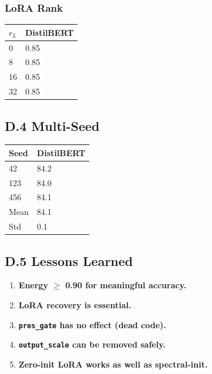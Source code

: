 \subsubsection{LoRA Rank}

\begin{table}[H]
\centering
\small
\begin{tabular}{ll}
\toprule
\textbf{$r_L$} & \textbf{DistilBERT} \\
\midrule
0 & 0.85 \\
8 & 0.85 \\
16 & 0.85 \\
32 & 0.85 \\
\bottomrule
\end{tabular}
\end{table}

\subsection{D.4 Multi-Seed}

\begin{table}[H]
\centering
\small
\begin{tabular}{ll}
\toprule
\textbf{Seed} & \textbf{DistilBERT} \\
\midrule
42 & 84.2 \\
123 & 84.0 \\
456 & 84.1 \\
Mean & 84.1 \\
Std & 0.1 \\
\bottomrule
\end{tabular}
\end{table}

\subsection{D.5 Lessons Learned}

\begin{enumerate}
\item \textbf{Energy $\ge$ 0.90 for meaningful accuracy.}
\item \textbf{LoRA recovery is essential.}
\item \textbf{\texttt{pres\_gate} has no effect (dead code).}
\item \textbf{\texttt{output\_scale} can be removed safely.}
\item \textbf{Zero-init LoRA works as well as spectral-init.}

\end{enumerate}
